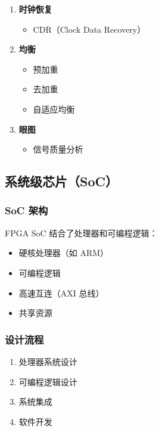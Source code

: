\begin{enumerate}
  \item \textbf{时钟恢复}
    \begin{itemize}
      \item CDR（Clock Data Recovery）
    \end{itemize}

  \item \textbf{均衡}
    \begin{itemize}
      \item 预加重
      \item 去加重
      \item 自适应均衡
    \end{itemize}

  \item \textbf{眼图}
    \begin{itemize}
      \item 信号质量分析
    \end{itemize}
\end{enumerate}

\subsection{系统级芯片（SoC）}

\subsubsection{SoC 架构}

FPGA SoC 结合了处理器和可编程逻辑：
\begin{itemize}
  \item 硬核处理器（如 ARM）
  \item 可编程逻辑
  \item 高速互连（AXI 总线）
  \item 共享资源
\end{itemize}

\subsubsection{设计流程}

\begin{enumerate}
  \item 处理器系统设计
  \item 可编程逻辑设计
  \item 系统集成
  \item 软件开发
\end{enumerate}

